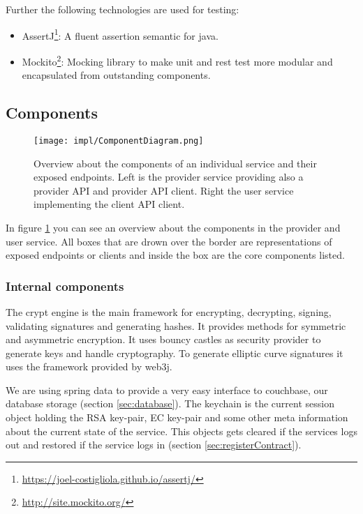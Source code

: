 Further the following technologies are used for testing:

\begin{itemize}
\item AssertJ\footnote{\url{https://joel-costigliola.github.io/assertj/}}: A fluent assertion semantic for java. 
\item Mockito\footnote{\url{http://site.mockito.org/}}: Mocking library to make unit and rest test more modular and encapsulated from outstanding components. 
\end{itemize}

\subsection{Components}
\begin{figure}
\texttt{[image: impl/ComponentDiagram.png]}
\centering
\caption{Overview about the components of an individual service and their exposed endpoints. Left is the provider service providing also a provider API and provider API client. Right the user service implementing the client API client.}
\label{fig:componentDiagram}
\end{figure}

In figure \ref{fig:componentDiagram} you can see an overview about the components in the provider and user service. All boxes that are drown over the border are representations of exposed endpoints or clients and inside the box are the core components listed.

\subsubsection{Internal components}
The crypt engine is the main framework for encrypting, decrypting, signing, validating signatures and generating hashes. It provides methods for symmetric and asymmetric encryption. It uses bouncy castles as security provider to generate keys and handle cryptography. To generate elliptic curve signatures it uses the framework provided by web3j. 

We are using spring data to provide a very easy interface to couchbase, our database storage (section \ref{sec:database}). The keychain is the current session object holding the RSA key-pair, EC key-pair and some other meta information about the current state of the service. This objects gets cleared if the services logs out and restored if the service logs in (section \ref{sec:registerContract}). 

